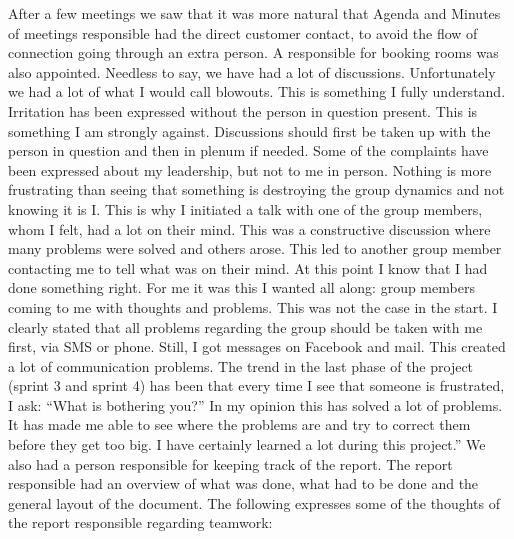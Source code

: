 \newline 
\newline
After a few meetings we saw that it was more natural that Agenda and Minutes of meetings responsible had the direct customer contact, to avoid the flow of connection going through an extra person. A responsible for booking rooms was also appointed.
\newline
\newline
Needless to say, we have had a lot of discussions. Unfortunately we had a lot of what I would call blowouts. This is something I fully understand. Irritation has been expressed without the person in question present. This is something I am strongly against. Discussions should first be taken up with the person in question and then in plenum if needed.
\newline
\newline
Some of the complaints have been expressed about my leadership, but not to me in person. Nothing is more frustrating than seeing that something is destroying the group dynamics and not knowing it is I. This is why I initiated a talk with one of the group members, whom I felt, had a lot on their mind. This was a constructive discussion where many problems were solved and others arose. This led to another group member contacting me to tell what was on their mind. At this point I know that I had done something right. For me it was this I wanted all along: group members coming to me with thoughts and problems. This was not the case in the start. I clearly stated that all problems regarding the group should be taken with me first, via SMS or phone. Still, I got messages on Facebook and mail. This created a lot of communication problems.
\newline
\newline
The trend in the last phase of the project (sprint 3 and sprint 4) has been that every time I see that someone is frustrated, I ask: “What is bothering you?” In my opinion this has solved a lot of problems. It has made me able to see where the problems are and try to correct them before they get too big. I have certainly learned a lot during this project.''
\newline
\newline
We also had a person responsible for keeping track of the report. The report responsible had an overview of what was done, what had to be done and the general layout of the document. The following expresses some of the thoughts of the report responsible regarding teamwork:
\newline
